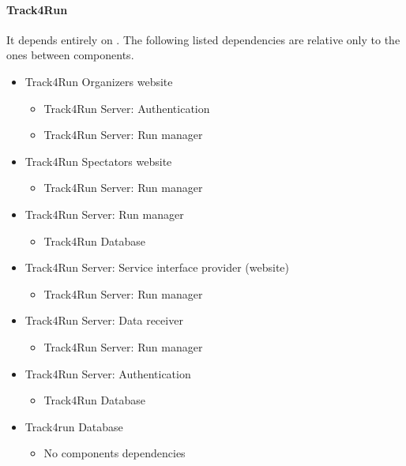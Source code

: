 		\paragraph{Track4Run}
		It depends entirely on . The following listed dependencies are relative only to the ones between  components.
		\begin{itemize}
			\item{Track4Run Organizers website}
			\begin{itemize}\item{Track4Run Server: Authentication}\item{Track4Run Server: Run manager}\end{itemize}
			\item{Track4Run Spectators website}
			\begin{itemize}\item{Track4Run Server: Run manager}\end{itemize}
			\item{Track4Run Server: Run manager}
			\begin{itemize}\item{Track4Run Database}\end{itemize}
			\item{Track4Run Server: Service interface provider (website)}
			\begin{itemize}\item{Track4Run Server: Run manager}\end{itemize}
			\item{Track4Run Server: Data receiver}
			\begin{itemize}\item{Track4Run Server: Run manager}\end{itemize}
			\item{Track4Run Server: Authentication}
			\begin{itemize}\item{Track4Run Database}\end{itemize}
			\item{Track4run Database}
			\begin{itemize}\item{No components dependencies}\end{itemize}
		\end{itemize}
